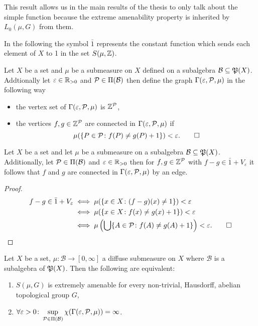 This result allows us in the main results of the thesis to only talk about the simple function because the extreme amenability property is inherited by $L_0(\mu, G)$ from them.

In the following the symbol $\bar{1}$ represents the constant function which sends each element of $X$ to 1 in the set $S(\mu, \Z)$. 

\begin{defin}
  Let $X$ be a set and $\mu$ be a submeasure on $X$ defined on a subalgebra $\mathcal{B} \subseteq \PowS(X)$. Addtionally let $\varepsilon \in \R_{>0}$ and $\P \in \Pi(\mathcal{B})$ then define the graph $\Gamma(\varepsilon, \P, \mu)$ in the following way
  \begin{itemize}
    \item the vertex set of $\Gamma(\varepsilon, \P, \mu)$ is $\Z^\P$,
    \item the vertices $f, g \in \Z^\P$ are connected in $\Gamma(\varepsilon, \P, \mu)$ if \[\mu(\{P \in \P\colon f(P) \neq g(P) + 1\}) < \varepsilon.\qedhere\]
  \end{itemize}
\end{defin}

\begin{lemma}\label{lem:1}
  Let $X$ be a set and let $\mu$ be a submeasure on a subalgebra $\mathcal{B} \subseteq \PowS(X)$. Additionally, let $\P \in \Pi(\mathcal{B})$ and $\varepsilon \in \R_{>0}$ then for $f,g \in \Z^\P$ with $f - g \in \bar{1} + V_\varepsilon$ it follows that $f$ and $g$ are connected in $\Gamma(\varepsilon, \P, \mu)$ by an edge.
\end{lemma}

\begin{proof}
  \begin{align*}
    f - g \in \bar{1} + V_\varepsilon   &\iff \mu(\{x \in X\colon (f-g)(x) \neq 1\}) < \varepsilon \\
                                      &\iff \mu(\{x \in X\colon f(x) \neq g(x) + 1\}) < \varepsilon \\
                                      &\iff \mu\left(\bigcup \{A \in \P \colon f(A) \neq g(A) + 1\}\right) < \varepsilon.\qedhere
  \end{align*}
\end{proof}

\begin{thm}\label{thm:colve}
  Let $X$ be a set, $\mu\colon \mathcal{B} \to [0, \infty]$ a diffuse submeasure on $X$ where $\mathcal{B}$ is a subalgebra of $\PowS(X)$. Then the following are equivalent:
  \begin{enumerate}
    \item $S(\mu, G)$ is extremely amenable for every non-trivial, Hausdorff, abelian topological group $G$,
    \item $\forall \varepsilon > 0\colon \sup\limits_{\P \in \Pi(\mathcal{B})}\chi(\Gamma(\varepsilon, \mathcal{P}, \mu)) = \infty$.
  \end{enumerate}
\end{thm}

